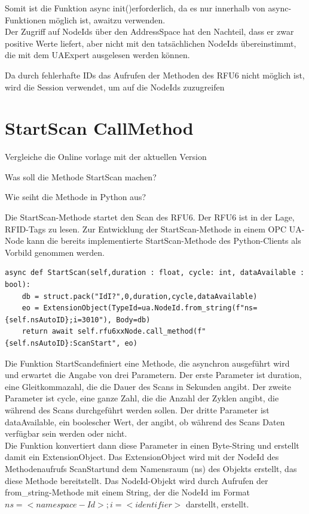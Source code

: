 Somit ist die Funktion \frqq async init()\flqq   erforderlich, da es nur innerhalb von async-Funktionen möglich ist, \frqq await\flqq   zu verwenden.\\

Der Zugriff auf NodeIds über den AddressSpace hat den Nachteil, dass er zwar positive Werte liefert, aber nicht mit den tatsächlichen NodeIds übereinstimmt, die mit dem UAExpert ausgelesen werden können.

Da durch fehlerhafte IDs das Aufrufen der Methoden des RFU6 nicht möglich ist, wird die Session verwendet, um auf die NodeIds zuzugreifen

\section{StartScan CallMethod}

Vergleiche die Online vorlage mit der aktuellen Version

Was soll die Methode StartScan machen?

Wie seiht die Methode in Python aus?

Die StartScan-Methode startet den Scan des RFU6. Der RFU6 ist in der Lage, RFID-Tags zu lesen. Zur Entwicklung der StartScan-Methode in einem OPC UA-Node kann die bereits implementierte StartScan-Methode des Python-Clients als Vorbild genommen werden.

\begin{lstlisting}[style=Python, caption={StartScan Python},label={StartScanPython}]
async def StartScan(self,duration : float, cycle: int, dataAvailable : bool):
    db = struct.pack("IdI?",0,duration,cycle,dataAvailable)
    eo = ExtensionObject(TypeId=ua.NodeId.from_string(f"ns={self.nsAutoID};i=3010"), Body=db)
    return await self.rfu6xxNode.call_method(f"{self.nsAutoID}:ScanStart", eo) 
\end{lstlisting}

Die Funktion \dq StartScan\dq  definiert eine Methode, die asynchron ausgeführt wird und erwartet die Angabe von drei Parametern. Der erste Parameter ist \dq duration\dq , eine Gleitkommazahl, die die Dauer des Scans in Sekunden angibt. Der zweite Parameter ist \dq cycle\dq , eine ganze Zahl, die die Anzahl der Zyklen angibt, die während des Scans durchgeführt werden sollen. Der dritte Parameter ist \dq dataAvailable\dq , ein boolescher Wert, der angibt, ob während des Scans Daten verfügbar sein werden oder nicht.\\

Die Funktion konvertiert dann diese Parameter in einen Byte-String und erstellt damit ein \dq ExtensionObject\dq . Das ExtensionObject wird mit der NodeId des Methodenaufrufs \dq ScanStart\dq  und dem Namensraum (ns) des Objekts erstellt, das diese Methode bereitstellt. Das NodeId-Objekt wird durch Aufrufen der \dq from\_string\dq  -Methode mit einem String, der die NodeId im Format $ns=<namespace-Id>;i=<identifier>$ darstellt, erstellt.\\

